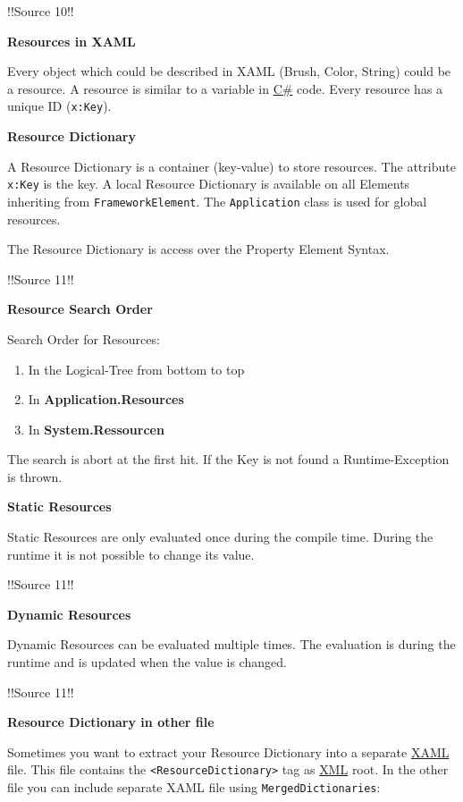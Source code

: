 \documentclass[10pt,twoside,landscape]{article}
\begin{document}
\begin{multicols}{4}
!!Source 10!!

\textbf{Resources in XAML}

Every object which could be described in XAML (Brush, Color, String) could be a resource.
A resource is similar to a variable in \href{../../../roam/20211003114158-c.org}{C\#} code.
Every resource has a unique ID (\texttt{x:Key}).

\textbf{Resource Dictionary}

A Resource Dictionary is a container (key-value) to store resources.
The attribute \texttt{x:Key} is the key.
A local Resource Dictionary is available on all Elements inheriting from \texttt{FrameworkElement}.
The \texttt{Application} class is used for global resources.

The Resource Dictionary is access over the Property Element Syntax.

!!Source 11!!

\textbf{Resource Search Order}

Search Order for Resources:
\begin{enumerate}
\item In the Logical-Tree from bottom to top
\item In \textbf{Application.Resources}
\item In \textbf{System.Ressourcen}
\end{enumerate}

The search is abort at the first hit.
If the Key is not found a Runtime-Exception is thrown.

\textbf{Static Resources}

Static Resources are only evaluated once during the compile time.
During the runtime it is not possible to change its value.

!!Source 11!!

\textbf{Dynamic Resources}

Dynamic Resources can be evaluated multiple times.
The evaluation is during the runtime and is updated when the value is changed.

!!Source 11!!

\textbf{Resource Dictionary in other file}

Sometimes you want to extract your Resource Dictionary into a separate \href{../../../roam/20211123162058-xaml.org}{XAML} file.
This file contains the \texttt{<ResourceDictionary>} tag as \href{../../../roam/20211112100344-xml.org}{XML} root.
In the other file you can include separate XAML file using \texttt{MergedDictionaries}:


\end{multicols}
\end{document}
